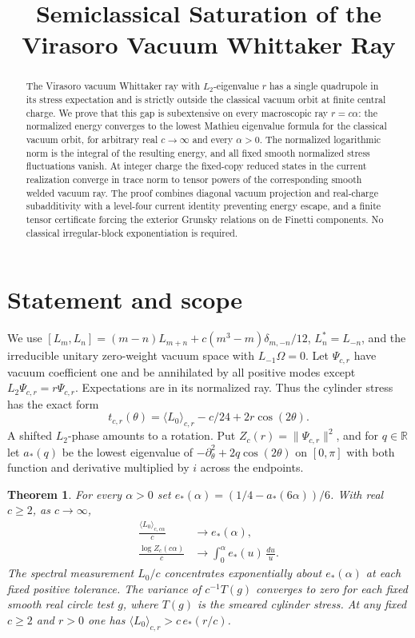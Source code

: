 \documentclass[11pt]{article}
\title{Semiclassical Saturation of the Virasoro Vacuum Whittaker Ray}
\author{}
\date{}
\newtheorem{theorem}{Theorem}
\begin{document}
\maketitle
\begin{abstract}
The Virasoro vacuum Whittaker ray with \(L_2\)-eigenvalue \(r\) has a single quadrupole in its stress expectation and is strictly outside the classical vacuum orbit at finite central charge. We prove that this gap is subextensive on every macroscopic ray \(r=c\alpha\): the normalized energy converges to the lowest Mathieu eigenvalue formula for the classical vacuum orbit, for arbitrary real \(c\to\infty\) and every \(\alpha>0\). The normalized logarithmic norm is the integral of the resulting energy, and all fixed smooth normalized stress fluctuations vanish. At integer charge the fixed-copy reduced states in the current realization converge in trace norm to tensor powers of the corresponding smooth welded vacuum ray. The proof combines diagonal vacuum projection and real-charge subadditivity with a level-four current identity preventing energy escape, and a finite tensor certificate forcing the exterior Grunsky relations on de Finetti components. No classical irregular-block exponentiation is required.
\end{abstract}

\section{Statement and scope}

We use \( [L_m,L_n]=(m-n)L_{m+n}+c(m^3-m)\delta_{m,-n}/12\), \(L_n^*=L_{-n}\), and the irreducible unitary zero-weight vacuum space with \(L_{-1}\Omega=0\). Let \(\Psi_{c,r}\) have vacuum coefficient one and be annihilated by all positive modes except \(L_2\Psi_{c,r}=r\Psi_{c,r}\). Expectations are in its normalized ray. Thus the cylinder stress has the exact form
\[
 t_{c,r}(\theta)=\langle L_0\rangle_{c,r}-c/24+2r\cos(2\theta).
\]
A shifted \(L_2\)-phase amounts to a rotation. Put \(Z_c(r)=\|\Psi_{c,r}\|^2\), and for \(q\in\mathbb R\) let \(a_*(q)\) be the lowest eigenvalue of \(-\partial_\theta^2+2q\cos(2\theta)\) on \([0,\pi]\) with both function and derivative multiplied by \(i\) across the endpoints.

\begin{theorem}\label{thm:main}
For every \(\alpha>0\) set \(e_*(\alpha)=(1/4-a_*(6\alpha))/6\). With real \(c\ge2\), as \(c\to\infty\),
\begin{align}
 \frac{\langle L_0\rangle_{c,c\alpha}}{c}&\longrightarrow e_*(\alpha),\label{eq:energylimit}\\
 \frac{\log Z_c(c\alpha)}{c}&\longrightarrow
                  \int_0^\alpha e_*(u)\,\frac{du}{u}.\label{eq:freelimit}
\end{align}
The spectral measurement \(L_0/c\) concentrates exponentially about \(e_*(\alpha)\) at each fixed positive tolerance. The variance of \(c^{-1}T(g)\) converges to zero for each fixed smooth real circle test \(g\), where \(T(g)\) is the smeared cylinder stress. At any fixed \(c\ge2\) and \(r>0\) one has \(\langle L_0\rangle_{c,r}>c\,e_*(r/c)\).
\end{theorem}
\end{document}
